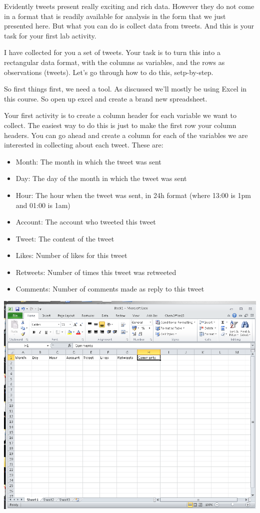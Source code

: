 \documentclass[]{book}
\providecommand{\tightlist}{%
  \setlength{\itemsep}{0pt}\setlength{\parskip}{0pt}}
\theoremstyle{definition}
\theoremstyle{definition}
\theoremstyle{definition}
\theoremstyle{remark}
\begin{document}
Evidently tweets present really exciting and rich data. However they do
not come in a format that is readily available for analysis in the form
that we just presented here. But what you can do is collect data from
tweets. And this is your task for your first lab activity.

I have collected for you a set of tweets. Your task is to turn this into
a rectangular data format, with the columns as variables, and the rows
as observations (tweets). Let's go through how to do this, setp-by-step.

So first things first, we need a tool. As discussed we'll mostly be
using Excel in this course. So open up excel and create a brand new
spreadsheet.

Your first activity is to create a column header for each variable we
want to collect. The easiest way to do this is just to make the first
row your column headers. You can go ahead and create a column for each
of the variables we are interested in collecting about each tweet. These
are:

\begin{itemize}
\tightlist
\item
  Month: The month in which the tweet was sent
\item
  Day: The day of the month in which the tweet was sent
\item
  Hour: The hour when the tweet was sent, in 24h format (where 13:00 is
  1pm and 01:00 is 1am)
\item
  Account: The account who tweeted this tweet
\item
  Tweet: The content of the tweet
\item
  Likes: Number of likes for this tweet
\item
  Retweets: Number of times this tweet was retweeted
\item
  Comments: Number of comments made as reply to this tweet
\end{itemize}

\includegraphics{imgs/column_headers_tweets.png}
\end{document}

